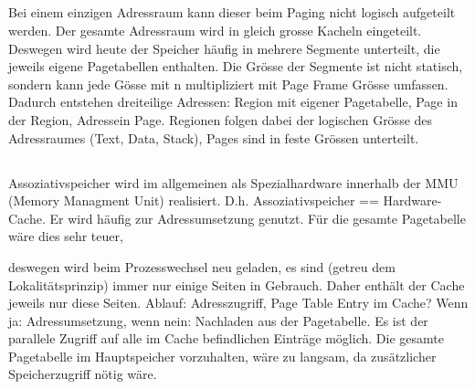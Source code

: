 \subsection{}
\begin{answer}
Bei einem einzigen Adressraum kann dieser beim Paging nicht logisch aufgeteilt werden. Der gesamte
Adressraum wird in gleich grosse Kacheln eingeteilt.
Deswegen wird heute der Speicher häufig in mehrere Segmente unterteilt, die jeweils eigene Pagetabellen
enthalten. Die Grösse der Segmente ist nicht statisch, sondern kann jede Gösse mit n
multipliziert mit Page Frame Grösse umfassen.
Dadurch entstehen dreiteilige Adressen:
Region mit eigener Pagetabelle, Page in der Region, Adressein Page.
Regionen folgen dabei der logischen Grösse des Adressraumes (Text, Data, Stack), Pages sind in
feste Grössen unterteilt.
\end{answer}

\subsection{}
\begin{answer}
Assoziativspeicher wird im allgemeinen als Spezialhardware innerhalb der MMU (Memory Managment
Unit) realisiert. D.h. Assoziativspeicher == Hardware-Cache.
Er wird häufig zur Adressumsetzung genutzt. Für die gesamte Pagetabelle wäre dies sehr teuer,

deswegen wird beim Prozesswechsel neu geladen, es sind (getreu dem Lokalitätsprinzip) immer nur
einige Seiten in Gebrauch. Daher enthält der Cache jeweils nur diese Seiten. Ablauf: Adresszugriff,
Page Table Entry im Cache? Wenn ja: Adressumsetzung, wenn nein: Nachladen aus der Pagetabelle.
Es ist der parallele Zugriff auf alle im Cache befindlichen Einträge möglich. Die gesamte Pagetabelle
im Hauptspeicher vorzuhalten, wäre zu langsam, da zusätzlicher Speicherzugriff nötig
wäre.
\end{answer}

